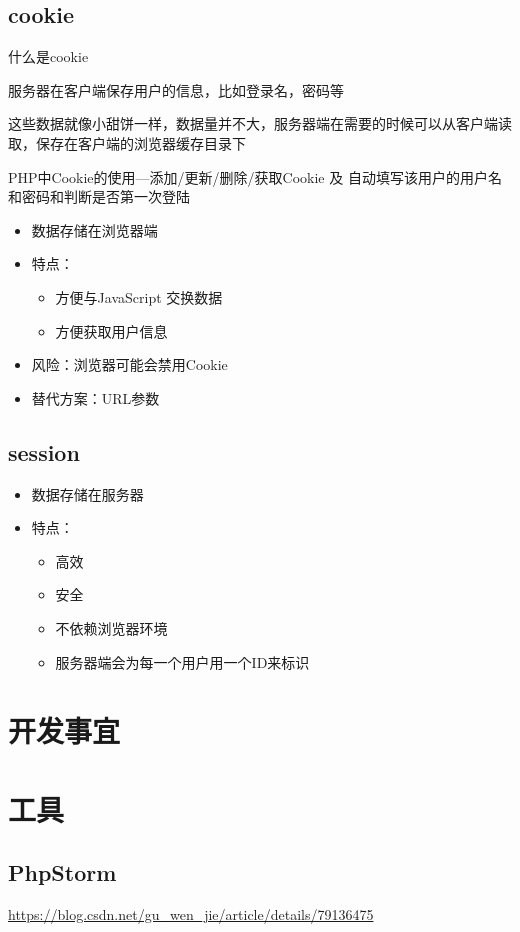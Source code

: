 \documentclass[UTF8,a4paper,12pt]{ctexbook}
\begin{document}
	\section{cookie}
		什么是cookie
		
		服务器在客户端保存用户的信息，比如登录名，密码等
		
		这些数据就像小甜饼一样，数据量并不大，服务器端在需要的时候可以从客户端读取，保存在客户端的浏览器缓存目录下

		PHP中Cookie的使用---添加/更新/删除/获取Cookie 及 自动填写该用户的用户名和密码和判断是否第一次登陆

		\begin{itemize}
			\item 数据存储在浏览器端
			\item 特点：
				\begin{itemize}
					\item 方便与JavaScript 交换数据
					\item 方便获取用户信息
				\end{itemize}
			\item 风险：浏览器可能会禁用Cookie
			\item 替代方案：URL参数
		\end{itemize}
		
	\section{session}
		\begin{itemize}
			\item 数据存储在服务器
			\item 特点：
				\begin{itemize}
					\item 高效
					\item 安全
					\item 不依赖浏览器环境
					\item 服务器端会为每一个用户用一个ID来标识
				\end{itemize}
		\end{itemize}
		
\chapter{开发事宜}
 
 
 
 
\chapter{工具}
	\section{PhpStorm}
		\url{https://blog.csdn.net/gu_wen_jie/article/details/79136475}
	
 		  			
\end{document}

